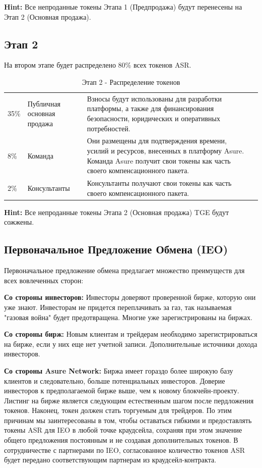 \textbf{Hint:} Все непроданные токены Этапа 1 (Предпродажа) будут перенесены на Этап 2 (Основная продажа).

\newpage

\subsection{Этап 2}

На втором этапе будет распределено 80\% всех токенов ASR.

\begin{table}[H]
\begin{tabular}{llp{}l}
  35\% & Публичная основная продажа & Взносы будут использованы для разработки платформы, а также для финансирования безопасности, юридических и оперативных потребностей. \\
  8\% & Команда  & Они размещены для подтверждения времени, усилий и ресурсов, внесенных в платформу Asure. Команда Asure получит свои токены как часть своего компенсационного пакета.\\
  2\% & Консультанты & Консультанты получают свои токены как часть своего компенсационного пакета.
\end{tabular}
\caption{\label{tab:table-name} Этап 2 - Распределение токенов}
\end{table}

\textbf{Hint:} Все непроданные токены Этапа 2 (Основная продажа) TGE  будут сожжены.

\subsection{Первоначальное Предложение Обмена (IEO)}
Первоначальное предложение обмена предлагает множество преимуществ для всех вовлеченных сторон:

\textbf{Со стороны инвесторов:}
Инвесторы доверяют проверенной бирже, которую они уже знают.
Инвесторам не придется переплачивать за газ, так называемая "газовая война" будет предотвращена.
Многие уже зарегистрированы на биржах.

\textbf{Со стороны бирж:}
Новым клиентам и трейдерам необходимо зарегистрироваться на бирже, если у них еще нет учетной записи. Дополнительные источники дохода инвесторов.

\textbf{Со стороны Asure Network:}
Биржа имеет гораздо более широкую базу клиентов и следовательно, больше потенциальных инвесторов.
Доверие инвесторов к предполагаемой бирже выше, чем к новому блокчейн-проекту.
Листинг на бирже является следующим естественным шагом после пердложения токенов. Наконец, токен должен стать торгуемым для трейдеров.
\newline\newline
По этим причинам мы заинтересованы в том, чтобы оставаться гибкими и предоставлять токены ASR для IEO в любой точке краудсейла, сохраняя при этом значение общего предложения постоянным и не создавая дополнительных токенов. В сотрудничестве с партнерами по IEO, согласованное количество токенов ASR будет передано соответствующим партнерам из краудсейл-контракта.

